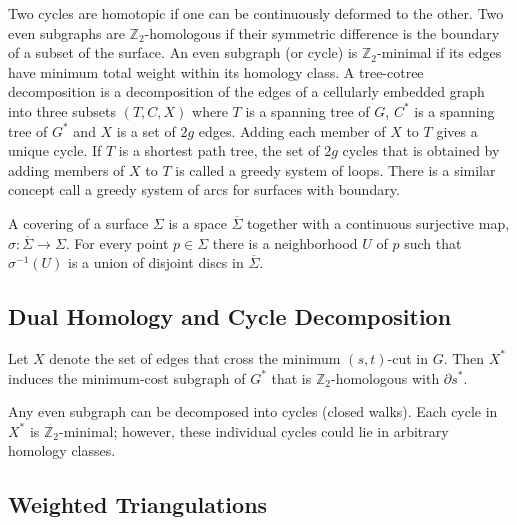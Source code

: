 \documentclass[natbib]{svcyclop}
\def\Z{\mathbb{Z}}
\begin{document}
Two cycles are homotopic if one can be continuously deformed to the other.  
Two even subgraphs are $\mathbb{Z}_2$-homologous if their symmetric difference is the boundary of a subset of the surface.
An even subgraph (or cycle) is $\Z_2$-minimal if its edges have minimum total weight within its homology class.
A tree-cotree decomposition is a decomposition of the edges of a cellularly embedded graph into three subsets $(T, C, X)$ where $T$ is a spanning tree of $G$, $C^*$ is a spanning tree of $G^*$ and $X$ is a set of $2g$ edges.  
Adding each member of $X$ to $T$ gives a unique cycle.  
If $T$ is a shortest path tree, the set of $2g$ cycles that is obtained by adding members of $X$ to $T$ is called a greedy system of loops.
There is a similar concept call a greedy system of arcs for surfaces with boundary.

A covering of a surface $\Sigma$ is a space $\overline{\Sigma}$ together with a continuous surjective map, $\sigma: \overline{\Sigma} \rightarrow \Sigma$. For every point $p \in \Sigma$ there is a neighborhood $U$ of $p$ such that $\sigma^{-1}(U)$ is a union of disjoint discs in $\overline{\Sigma}$.


\subsection{Dual Homology and Cycle Decomposition}

Let $X$ denote the set of edges that cross the minimum $(s,t)$-cut in $G$.  Then $X^*$ induces the minimum-cost subgraph of $G^*$ that is $\Z_2$-homologous with $\partial s^*$.

Any even subgraph can be decomposed into cycles (closed walks).  Each cycle in $X^*$ is $\Z_2$-minimal; however, these individual cycles could lie in arbitrary homology classes.


\subsection{Weighted Triangulations}
\end{document}
